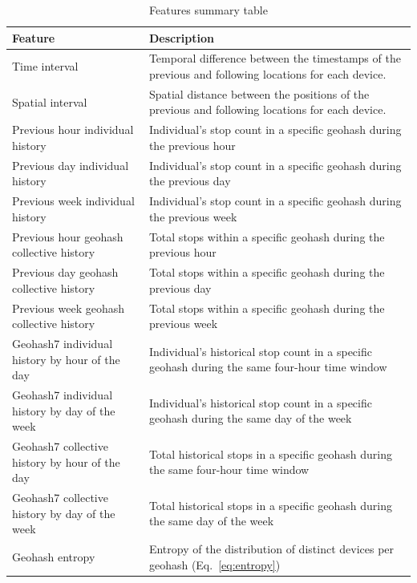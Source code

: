 \documentclass{article}
\begin{document}
\begin{table}
	\caption{Features summary table}
	\centering
 \begin{scriptsize}
	\begin{tabular}{ll}
		\toprule
		Feature     & Description   \\
		\midrule
	Time interval & Temporal difference between the timestamps of the previous and following locations for each device. \\
		Spatial interval & Spatial distance between the positions of the previous and following locations for each device. \\
		Previous hour individual history &  Individual's stop count in a specific geohash during the previous hour \\
		Previous day individual history     & Individual's stop count in a specific geohash during the previous day  \\
		Previous week individual history     & Individual's stop count in a specific geohash during the previous week  \\
  
		Previous hour geohash collective history & Total stops within a specific geohash during the previous hour \\
		Previous day geohash collective history     & Total stops within a specific geohash during the previous day  \\
		Previous week geohash collective history     & Total stops within a specific geohash during the previous week  \\
  
		Geohash7 individual history by hour of the day   & Individual's historical stop count in a specific geohash during the same four-hour time window \\
		Geohash7 individual history by day of the week    & Individual's historical stop count in a specific geohash during the same day of the week  \\
  
		Geohash7 collective history by hour of the day   & Total historical stops in a specific geohash during the same four-hour time window  \\
		Geohash7 collective history by day of the week     & Total historical stops in a specific geohash during the same day of the week  \\
  
		Geohash entropy     & Entropy of the distribution of distinct devices per geohash (Eq.~\ref{eq:entropy})\\
  

\end{tabular}
\end{scriptsize}
\end{table}
\end{document}
